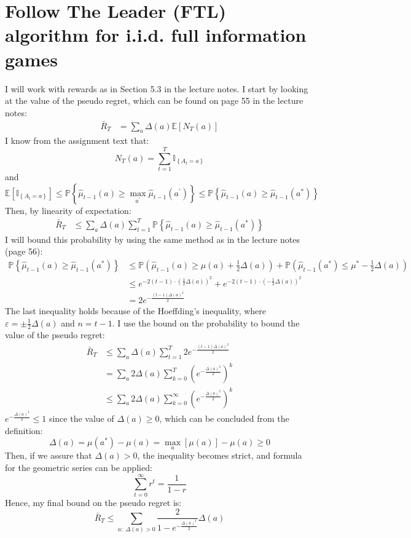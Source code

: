 \documentclass[a4paper]{article}
\begin{document}
\section{Follow The Leader (FTL) algorithm for i.i.d. full information games}
\label{sec:3}
I will work with rewards as in Section
5.3 in the lecture notes. I start by looking at the value of
the pseudo regret, which can be found on page 55 in the lecture notes:
\begin{align*}
  \bar{R}_T &= \sum_{a} \Delta(a) \mathbb{E}\left[N_{T}(a)\right]
\end{align*}
I know from the assignment text that:
\[
N_{T}(a)=\sum_{t=1}^{T} \mathbb{I}_{\left\{A_{t}=a\right\}}
\]
and
\[
\mathbb{E}\left[\mathbb{I}_{\left\{A_{t}=a\right\}}\right]
\leq \mathbb{P}\left\{\hat{\mu}_{t-1}(a) \geq \max _{a^{\prime}}
\hat{\mu}_{t-1}\left(a^{\prime}\right)\right\}
\leq \mathbb{P}\left\{\hat{\mu}_{t-1}(a) \geq \hat{\mu}_{t-1}\left(a^{*}\right)\right\}
\]
Then, by linearity of expectation:
\begin{align*}
  \bar{R}_T &\leq \sum_{a} \Delta(a) \sum_{t=1}^{T}\mathbb{P}\left\{\hat{\mu}_{t-1}(a) \geq \hat{\mu}_{t-1}\left(a^{*}\right)\right\}
\end{align*}
I will bound this probability by using the same method as in the lecture
notes (page 56):
\begin{align*}
  \mathbb{P}\left\{\hat{\mu}_{t-1}(a) \geq \hat{\mu}_{t-1}\left(a^{*}\right)\right\}
  &\leq \mathbb{P}\left(\hat{\mu}_{t-1}(a) \geq \mu(a)+\frac{1}{2}
  \Delta(a)\right)+\mathbb{P}\left(\hat{\mu}_{t-1}\left(a^{*}\right) \leq
  \mu^{*}-\frac{1}{2} \Delta(a)\right) \\
  &\leq e^{-2(t-1) \cdot (\frac{1}{2} \Delta(a))^2} + e^{-2(t-1) \cdot (-\frac{1}{2} \Delta(a))^2} \\
  &=2e^{-\frac{(t-1)\Delta(a)^2}{2}}
\end{align*}
The last inequality holds because of the Hoeffding's inequality, where
$\varepsilon = \pm \frac{1}{2}\Delta(a)$ and $n=t-1$.
I use the bound on the probability to bound the value of the pseudo regret:
\begin{align*}
  \bar{R}_T &\leq \sum_{a} \Delta(a)\sum_{t=1}^{T}2e^{-\frac{(t-1)\Delta(a)^2}{2}}\\
  &=\sum_{a} 2\Delta(a)\sum_{k=0}^{T}(e^{-\frac{\Delta(a)^2}{2}})^k \tag{$k=t-1$} \\
  &\leq \sum_{a} 2\Delta(a)\sum_{k=0}^{\infty}(e^{-\frac{\Delta(a)^2}{2}})^k 
  \tag{since $e > 0$}
\end{align*}
$e^{-\frac{\Delta(a)^2}{2}} \leq 1$ since the value of $\Delta(a) \geq 0$, which
can be concluded from the definition:
\[
\Delta(a)=\mu\left(a^{*}\right)-\mu(a) = \max _{a}[\mu(a)] - \mu(a) \geq 0
\]
Then, if we assure that $\Delta(a) > 0$, the
inequality becomes strict, and formula for the geometric series can be applied:
\[
\sum_{t=0}^{\infty} r^{t}=\frac{1}{1-r}\tag{for $r<1$}
\]
Hence, my final bound on the pseudo regret is:
\[
\bar{R}_T \leq \sum_{a:\; \Delta(a) > 0} \frac{2}{1- e^{-\frac{\Delta(a)^2}{2}}}\Delta(a) 
\]
\end{document}

